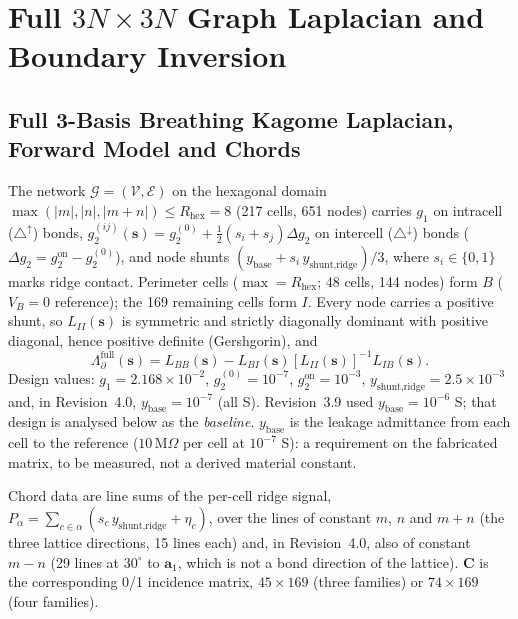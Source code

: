 \documentclass[11pt,a4paper]{article}
\theoremstyle{definition}
\theoremstyle{remark}
\begin{document}
\section{Full $3N\times 3N$ Graph Laplacian and Boundary Inversion}\label{sec:inv}

\subsection{Full 3-Basis Breathing Kagome Laplacian, Forward Model and Chords}
The network $\mathcal{G}=(\mathcal{V},\mathcal{E})$ on the hexagonal domain $\max(|m|,|n|,|m+n|)\le R_{\text{hex}} = 8$ (217 cells, 651 nodes) carries $g_1$ on intracell ($\triangle^{\uparrow}$) bonds, $g_2^{(ij)}(\mathbf{s}) = g_2^{(0)} + \tfrac12(s_i+s_j)\Delta g_2$ on intercell ($\triangle^{\downarrow}$) bonds ($\Delta g_2 = g_2^{\text{on}}-g_2^{(0)}$), and node shunts $(y_{\text{base}} + s_i\,y_{\text{shunt,ridge}})/3$, where $s_i\in\{0,1\}$ marks ridge contact. Perimeter cells ($\max = R_{\text{hex}}$; 48 cells, 144 nodes) form $B$ ($V_B=0$ reference); the 169 remaining cells form $I$. Every node carries a positive shunt, so $L_{II}(\mathbf{s})$ is symmetric and strictly diagonally dominant with positive diagonal, hence positive definite (Gershgorin), and~\cite{schur1917,calderon1980}
\begin{equation}
\Lambda^{\text{full}}_{\partial}(\mathbf{s}) = L_{BB}(\mathbf{s}) - L_{BI}(\mathbf{s})[L_{II}(\mathbf{s})]^{-1}L_{IB}(\mathbf{s}).
\end{equation}
Design values: $g_1 = 2.168\times10^{-2}$, $g_2^{(0)} = 10^{-7}$, $g_2^{\text{on}} = 10^{-3}$, $y_{\text{shunt,ridge}} = 2.5\times10^{-3}$ and, in Revision~4.0, $y_{\text{base}} = 10^{-7}$ (all S). Revision~3.9 used $y_{\text{base}} = 10^{-6}$ S; that design is analysed below as the \emph{baseline}. $y_{\text{base}}$ is the leakage admittance from each cell to the reference ($10\,\text{M}\Omega$ per cell at $10^{-7}$ S): a requirement on the fabricated matrix, to be measured, not a derived material constant.

Chord data are line sums of the per-cell ridge signal, $P_\alpha = \sum_{c\in\alpha}(s_c\,y_{\text{shunt,ridge}} + \eta_c)$, over the lines of constant $m$, $n$ and $m+n$ (the three lattice directions, 15 lines each) and, in Revision~4.0, also of constant $m-n$ (29 lines at $30^\circ$ to $\mathbf{a}_1$, which is not a bond direction of the lattice). $\mathbf{C}$ is the corresponding 0/1 incidence matrix, $45\times169$ (three families) or $74\times169$ (four families).
\end{document}
